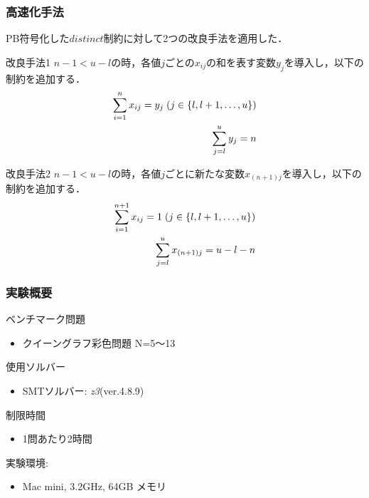 \documentclass [dvipdfmx,12pt]{beamer}
\newcommand{\distinct}{$distinct$}
\begin{document}

\begin{frame}\footnotesize
    \frametitle{高速化手法}
    PB符号化した\distinct 制約に対して2つの改良手法を適用した．
    \begin{exampleblock}{改良手法1}
        $n-1 < u-l$の時，各値$j$ごとの$x_{ij}$の和を表す変数$y_{j}$を導入し，以下の制約を追加する．
    \vspace{-3mm}
        \begin{eqnarray}
            \sum_{i=1}^{n} x_{ij}=y_j \; (j \in \{l,l+1, \ldots,u\})\\
    \vspace{-3mm}
            \sum_{j=l}^{u} y_j = n
        \end{eqnarray}
    \end{exampleblock}
    \vspace{-3mm}
    \begin{exampleblock}{改良手法2}
        $n-1 < u-l$の時，各値$j$ごとに新たな変数$x_{(n+1)j}$を導入し，以下の制約を追加する．
    \vspace{-3mm}
        \begin{eqnarray}
            \sum_{i=1}^{n+1} x_{ij}=1 \; (j \in \{l,l+1, \ldots,u\})\\
    \vspace{-3mm}
            \sum_{j=l}^{u} x_{(n+1)j} = u-l-n
        \end{eqnarray}
    \end{exampleblock}
\end{frame}


\begin{frame}
    \frametitle{実験概要}
    ベンチマーク問題
    \begin{itemize}
        \item クイーングラフ彩色問題 N=5〜13
    \end{itemize}
    使用ソルバー
    \begin{itemize}
        \item SMTソルバー: \textit{z3}(ver.4.8.9)
    \end{itemize}
    制限時間
    \begin{itemize}
        \item 1問あたり2時間
    \end{itemize}
    実験環境:
    \begin{itemize}
        \item Mac mini,  3.2GHz,  64GB メモリ
    \end{itemize}
\end{frame}
\end{document}
